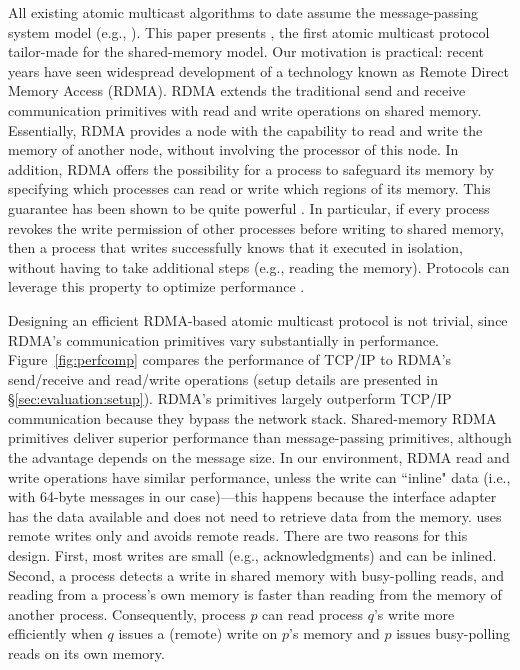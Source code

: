 All existing atomic multicast algorithms to date assume the message-passing system model (e.g., \cite{Coelho2017,gotsman2019white,birman1987reliable, delporte2000fault, bezerra2015ridge,
marandi2012multi}).
This paper presents \libname, the first atomic multicast protocol tailor-made for the shared-memory model.
Our motivation is practical: recent years have seen widespread development of a technology known as Remote Direct Memory Access (RDMA).
RDMA extends the traditional send and receive communication primitives with read and write operations on shared memory.
Essentially, RDMA provides a node with the capability to read and write the memory of another node, without involving the processor of this node.
In addition, RDMA offers the possibility for a process to safeguard its memory by specifying which processes can read or write which regions of its memory.
This guarantee has been shown to be quite powerful \cite{Aguilera2019}.
In particular, if every process revokes the write permission of other processes before writing to shared memory, then a process that writes successfully knows that it executed in isolation, without having to take additional steps (e.g., reading the memory). 
Protocols can leverage this property to optimize performance \cite{Aguilera2019}.

Designing an efficient RDMA-based atomic multicast protocol is not trivial, since RDMA's communication primitives vary substantially in performance.
Figure~\ref{fig:perfcomp} compares the performance of TCP/IP to RDMA's send/receive and read/write operations (setup details are presented in \S\ref{sec:evaluation:setup}).
RDMA's primitives largely outperform TCP/IP communication because they bypass the network stack.
Shared-memory RDMA primitives deliver superior performance than message-passing primitives, although the advantage depends on the message size.
In our environment, RDMA read and write operations have similar performance, unless the write can ``inline" data (i.e., with 64-byte messages in our case)---this happens because the interface adapter has the data available and does not need to retrieve data from the memory.
\libname uses remote writes only and avoids remote reads.
There are two reasons for this design.
First, most writes are small (e.g., acknowledgments) and can be inlined.
Second, a process detects a write in shared memory with busy-polling reads, and reading from a process's own memory is faster than reading from the memory of another process.
Consequently, process $p$ can read process $q$'s write more efficiently when $q$ issues a (remote) write on $p$'s memory and $p$ issues busy-polling reads on its own memory.  

